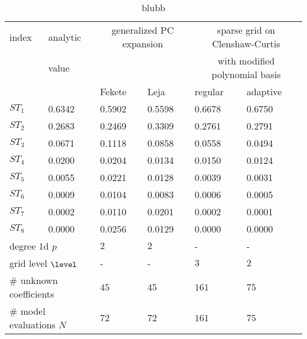 
\begin{table}[!ht]
  \fontsize{8pt}{3ex}\selectfont
  \renewcommand{\arraystretch}{1.2}
  \begin{tabularx}{\textwidth}{XXXXXX}
    \toprule
    index &
    analytic &
    \multicolumn{2}{c}{generalized PC expansion} &
    \multicolumn{2}{c}{sparse grid on Clenshaw-Curtis} \\
    & value & & &
    \multicolumn{2}{c}{with modified polynomial basis} \\
    \hline
    & &
    \multicolumn{1}{l}{Fekete} &
    \multicolumn{1}{l}{Leja} &
    \multicolumn{1}{l}{regular} &
    \multicolumn{1}{l}{adaptive} \\
    \toprule
    $ST_1$ & 0.6342 & 0.5902 & 0.5598 & 0.6678 & 0.6750 \\
    $ST_2$ & 0.2683 & 0.2469 & 0.3309 & 0.2761 & 0.2791 \\
    $ST_3$ & 0.0671 & 0.1118 & 0.0858 & 0.0558 & 0.0494 \\
    $ST_4$ & 0.0200 & 0.0204 & 0.0134 & 0.0150 & 0.0124 \\
    $ST_5$ & 0.0055 & 0.0221 & 0.0128 & 0.0039 & 0.0031 \\
    $ST_6$ & 0.0009 & 0.0104 & 0.0083 & 0.0006 & 0.0005 \\
    $ST_7$ & 0.0002 & 0.0110 & 0.0201 & 0.0002 & 0.0001 \\
    $ST_8$ & 0.0000 & 0.0256 & 0.0129 & 0.0000 & 0.0000 \\
    \hline
        \multicolumn{2}{l}{degree 1d $p$} &
    \multicolumn{1}{l}{$2$} &
    \multicolumn{1}{l}{$2$} &
    \multicolumn{1}{l}{-} &
    \multicolumn{1}{l}{-} \\
    \multicolumn{2}{l}{grid level $\level$} &
    \multicolumn{1}{l}{-} &
    \multicolumn{1}{l}{-} &
    \multicolumn{1}{l}{$3$} &
    \multicolumn{1}{l}{$2$} \\
    \multicolumn{2}{l}{\# unknown coefficients} &
    \multicolumn{1}{l}{$45$} &
    \multicolumn{1}{l}{$45$} &
    \multicolumn{1}{l}{$161$} &
    \multicolumn{1}{l}{$75$} \\
    \multicolumn{2}{l}{\# model evaluations $N$} &
    \multicolumn{1}{l}{$72$} &
    \multicolumn{1}{l}{$72$} &
    \multicolumn{1}{l}{$161$} &
    \multicolumn{1}{l}{$75$} \\
    \bottomrule
  \end{tabularx}
  \caption{blubb}
  \label{tab::sobolgfunction-full-model-anova}
\end{table}
